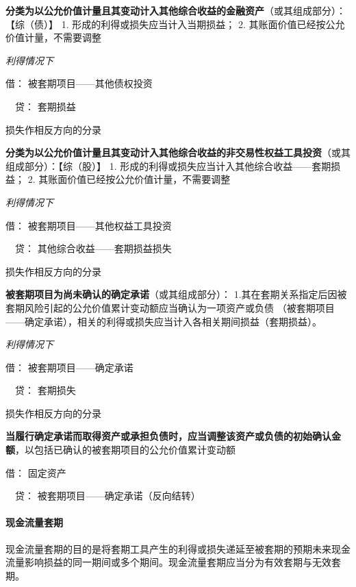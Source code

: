 \documentclass[UTF8,12pt]{ctexart}
\newenvironment{Dr}{\noindent 借：}{\par}
\newenvironment{Cr}{\noindent \ \ 贷：}{\par}
\numberwithin{equation}{section} %
\numberwithin{figure}{section}
\numberwithin{table}{section}
\begin{document}
	\textbf{分类为以公允价值计量且其变动计入其他综合收益的金融资产}（或其组成部分）：【综（债）】
	1.	形成的利得或损失应当计入当期损益；
	2.	其账面价值已经按公允价值计量，不需要调整
	
	\textit{利得情况下}
	
	\begin{Dr}
		被套期项目——其他债权投资
	\end{Dr}
	\begin{Cr}
		套期损益
	\end{Cr}
	损失作相反方向的分录
	
	\textbf{分类为以公允价值计量且其变动计入其他综合收益的非交易性权益工具投资}（或其组成部分）：【综（股）】
	1.	形成的利得或损失应当计入其他综合收益——套期损益；
	2.	其账面价值已经按公允价值计量，不需要调整
	
	\textit{利得情况下}
	
	\begin{Dr}
		被套期项目——其他权益工具投资
	\end{Dr}
	\begin{Cr}
		其他综合收益——套期损益损失
	\end{Cr}
	损失作相反方向的分录
	
	\textbf{被套期项目为尚未确认的确定承诺}（或其组成部分）：
	1.其在套期关系指定后因被套期风险引起的公允价值累计变动额应当确认为一项资产或负债
	（被套期项目——确定承诺），相关的利得或损失应当计入各相关期间损益（套期损益）。
	
	\textit{利得情况下}
	
	\begin{Dr}
		被套期项目——确定承诺
	\end{Dr}
	\begin{Cr}
		套期损失
	\end{Cr}
	损失作相反方向的分录
	
	\textbf{当履行确定承诺而取得资产或承担负债时，应当调整该资产或负债的初始确认金额}，以包括已确认的被套期项目的公允价值累计变动额
	
	\begin{Dr}
		固定资产
	\end{Dr}
	\begin{Cr}
		被套期项目——确定承诺（反向结转）
	\end{Cr}
	
	
	\paragraph{现金流量套期}
	现金流量套期的目的是将套期工具产生的利得或损失递延至被套期的预期未来现金流量影响损益的同一期间或多个期间。现金流量套期应当分为有效套期与无效套期。
	
\end{document}
